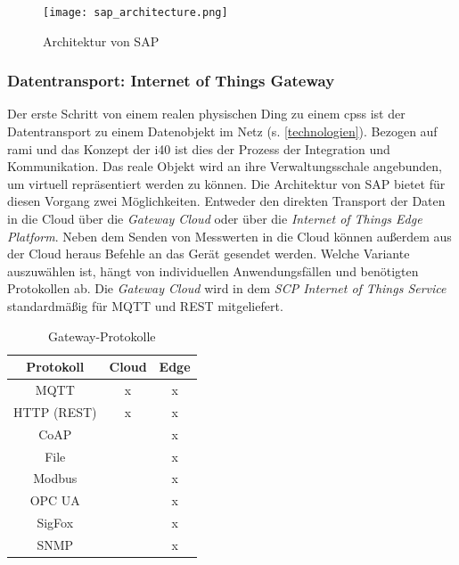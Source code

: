 \begin{figure}[ht!]
  \centering
 \texttt{[image: sap\_architecture.png]}
  \caption[Architektur von SAP]{Architektur von SAP \citep{Ganz2019}}
  \label{saparch}
\end{figure}

\newpage
\subsubsection{Datentransport: Internet of Things Gateway} \label{datentransport}

  Der erste Schritt von einem realen physischen Ding zu einem \ac{cpss} ist der Datentransport zu einem Datenobjekt im Netz (s. \ref{technologien}). Bezogen auf \ac{rami} und das Konzept der \acf{i40} ist dies der Prozess der Integration und Kommunikation. Das reale Objekt wird an ihre Verwaltungsschale angebunden, um virtuell repräsentiert werden zu können. Die Architektur von SAP bietet für diesen Vorgang zwei Möglichkeiten. Entweder den direkten Transport der Daten in die Cloud über die \textit{Gateway Cloud} oder über die \textit{Internet of Things Edge Platform}. Neben dem Senden von Messwerten in die Cloud können außerdem aus der Cloud heraus Befehle an das Gerät gesendet werden. Welche Variante auszuwählen ist, hängt von individuellen Anwendungsfällen und benötigten Protokollen ab. Die \textit{Gateway Cloud} wird in dem \textit{SCP Internet of Things Service} standardmäßig für MQTT und REST mitgeliefert.
  
  \begin{table}
    \centering
    \begin{tabular}{ccc}\\\toprule
    Protokoll & Cloud & Edge \\\midrule
    MQTT &x & x\\  \midrule
    HTTP (REST) & x & x\\  \midrule
    CoAP& & x\\  \midrule
    File &  & x\\  \midrule
    Modbus & & x\\  \midrule
    OPC UA & & x\\  \midrule
    SigFox & & x\\  \midrule
    SNMP & & x\\  \bottomrule
    \end{tabular}
    \label{protocol}
    \caption{Gateway-Protokolle}\label{gateway}
  \end{table}
 

